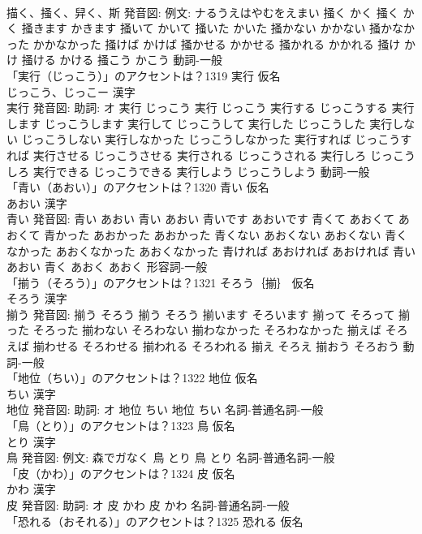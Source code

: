 \documentclass[8pt]{extreport}
\begin{document}
\begin{CJK}{UTF8}{min}
\\	描く、掻く、舁く、斯 発音図: 例文: ナるうえはやむをえまい	掻く かく		掻く かく 掻きます かきます 掻いて かいて 掻いた かいた 掻かない かかない 掻かなかった かかなかった 掻けば かけば 掻かせる かかせる 掻かれる かかれる 掻け かけ 掻ける かける 掻こう かこう				動詞-一般 
\\	「実行（じっこう）」のアクセントは？1319	実行 仮名　
\\	じっこう、じっこー 漢字　
\\	実行 発音図: 助詞: オ	実行 じっこう		実行 じっこう 実行する じっこうする 実行します じっこうします 実行して じっこうして 実行した じっこうした 実行しない じっこうしない 実行しなかった じっこうしなかった 実行すれば じっこうすれば 実行させる じっこうさせる 実行される じっこうされる 実行しろ じっこうしろ 実行できる じっこうできる 実行しよう じっこうしよう				動詞-一般 
\\	「青い（あおい）」のアクセントは？1320	青い 仮名　
\\	あおい 漢字　
\\	青い 発音図:	青い あおい		青い あおい 青いです あおいです 青くて あおくて あおくて 青かった あおかった あおかった 青くない あおくない あおくない 青くなかった あおくなかった あおくなかった 青ければ あおければ あおければ 青い あおい 青く あおく あおく				形容詞-一般 
\\	「揃う（そろう）」のアクセントは？1321	そろう｛揃｝ 仮名　
\\	そろう 漢字　
\\	揃う 発音図:	揃う そろう		揃う そろう 揃います そろいます 揃って そろって 揃った そろった 揃わない そろわない 揃わなかった そろわなかった 揃えば そろえば 揃わせる そろわせる 揃われる そろわれる 揃え そろえ 揃おう そろおう				動詞-一般 
\\	「地位（ちい）」のアクセントは？1322	地位 仮名　
\\	ちい 漢字　
\\	地位 発音図: 助詞: オ	地位 ちい		地位 ちい				名詞-普通名詞-一般 
\\	「鳥（とり）」のアクセントは？1323	鳥 仮名　
\\	とり 漢字　
\\	鳥 発音図: 例文: 森でガなく	鳥 とり		鳥 とり				名詞-普通名詞-一般 
\\	「皮（かわ）」のアクセントは？1324	皮 仮名　
\\	かわ 漢字　
\\	皮 発音図: 助詞: オ	皮 かわ		皮 かわ				名詞-普通名詞-一般 
\\	「恐れる（おそれる）」のアクセントは？1325	恐れる 仮名　

\end{CJK}
\end{document}
